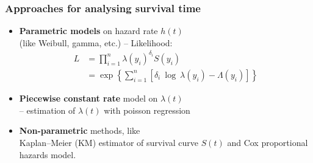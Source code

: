 \documentclass[12pt]{beamer}
\begin{document}
\begin{frame}
\frametitle{Approaches for analysing survival time}

\begin{itemize}
\item 
\textbf{Parametric models} on hazard rate $h(t)$ \\ %
(like %
Weibull, gamma, etc.) %
 -- Likelihood:
\begin{align*} L & = \prod_{i=1}^n \lambda(y_i)^{\delta_i} S(y_i) \\
  & = 
   \exp\left\{ \sum_{i=1}^n 
     [ \delta_i \: \log \: \lambda(y_i) - \Lambda(y_i) ] 
       \right\} 
\end{align*}   
\item 
\textbf{Piecewise constant rate} model on $\lambda(t)$ \\ 
-- estimation of $\hat\lambda(t)$ with poisson regression 
\item 
\textbf{Non-parametric} methods, 
like \\ Kaplan--Meier (KM) %
estimator of survival curve $S(t)$ and Cox %
proportional hazards model.

\end{itemize}
\end{frame}
\end{document}
